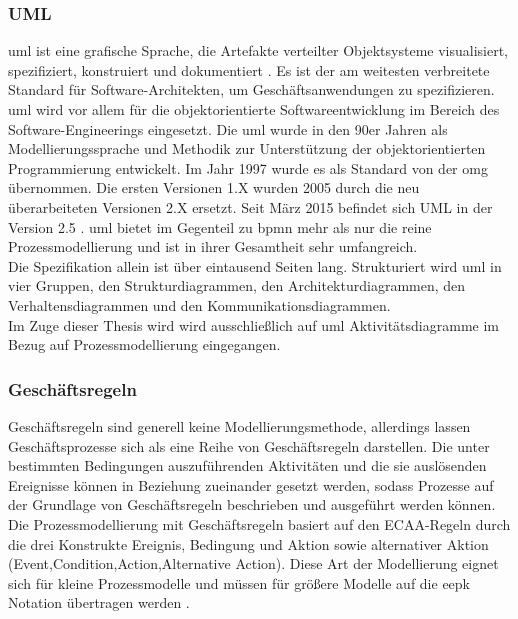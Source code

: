 \documentclass[a4paper, 12pt, twoside, headsepline=true]{scrartcl} %
\begin{document}


\subsubsection{UML}\label{uml}
 \ac{uml} ist eine grafische Sprache, die Artefakte verteilter Objektsysteme visualisiert, spezifiziert, konstruiert und dokumentiert \cite{Kleuker}. Es ist der am weitesten verbreitete Standard für Software-Architekten, um Geschäftsanwendungen zu spezifizieren.\\
 \ac{uml} wird vor allem für die objektorientierte Softwareentwicklung im Bereich des Software-Engineerings eingesetzt.
Die \ac{uml} wurde in den 90er Jahren als Modellierungssprache und Methodik zur Unterstützung der objektorientierten Programmierung entwickelt. Im Jahr 1997 wurde es als Standard von der \ac{omg} übernommen. Die ersten Versionen 1.X wurden 2005 durch die neu überarbeiteten Versionen 2.X ersetzt. Seit März 2015 befindet sich UML in der Version 2.5 \cite{omguml}. \ac{uml} bietet im Gegenteil zu \ac{bpmn} mehr als nur die reine Prozessmodellierung und ist in ihrer Gesamtheit sehr umfangreich.\\
Die Spezifikation allein ist über eintausend Seiten lang. Strukturiert wird \ac{uml} in vier Gruppen, den  Strukturdiagrammen, den Architekturdiagrammen, den Verhaltensdiagrammen und den Kommunikationsdiagrammen. \\
Im Zuge dieser Thesis wird wird ausschließlich auf \ac{uml} Aktivitätsdiagramme im Bezug auf Prozessmodellierung eingegangen.

\subsubsection{Geschäftsregeln}\label{businessrules}
Geschäftsregeln sind generell keine Modellierungsmethode, allerdings lassen Geschäftsprozesse sich als eine Reihe von Geschäftsregeln darstellen. Die unter bestimmten Bedingungen auszuführenden Aktivitäten und die sie auslösenden Ereignisse können in Beziehung zueinander gesetzt werden, sodass Prozesse auf der Grundlage von Geschäftsregeln beschrieben und ausgeführt werden können.\\
Die Prozessmodellierung mit Geschäftsregeln basiert auf den  ECAA-Regeln durch die drei Konstrukte Ereignis, Bedingung und Aktion sowie alternativer Aktion (Event,Condition,Action,Alternative Action). Diese Art der Modellierung eignet sich für kleine Prozessmodelle und müssen für größere Modelle auf die \ac{eepk} Notation übertragen werden \cite{businessrules}. 
\end{document}
